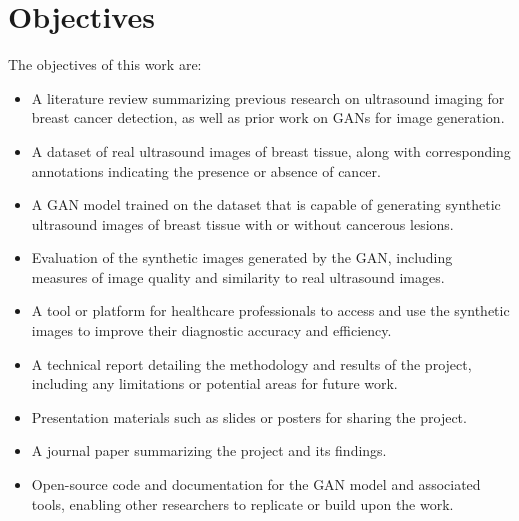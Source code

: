 \section{Objectives}
The objectives of this work are:
\begin{itemize}
\item A literature review summarizing previous research on ultrasound imaging for breast cancer detection, as well as prior work on GANs for image generation.
\item A dataset of real ultrasound images of breast tissue, along with corresponding annotations indicating the presence or absence of cancer.
\item A GAN model trained on the dataset that is capable of generating synthetic ultrasound images of breast tissue with or without cancerous lesions.
\item Evaluation of the synthetic images generated by the GAN, including measures of image quality and similarity to real ultrasound images.
\item A tool or platform for healthcare professionals to access and use the synthetic images to improve their diagnostic accuracy and efficiency.
\item A technical report detailing the methodology and results of the project, including any limitations or potential areas for future work.
\item Presentation materials such as slides or posters for sharing the project.
\item A journal paper summarizing the project and its findings.
\item Open-source code and documentation for the GAN model and associated tools, enabling other researchers to replicate or build upon the work.
\end{itemize}
